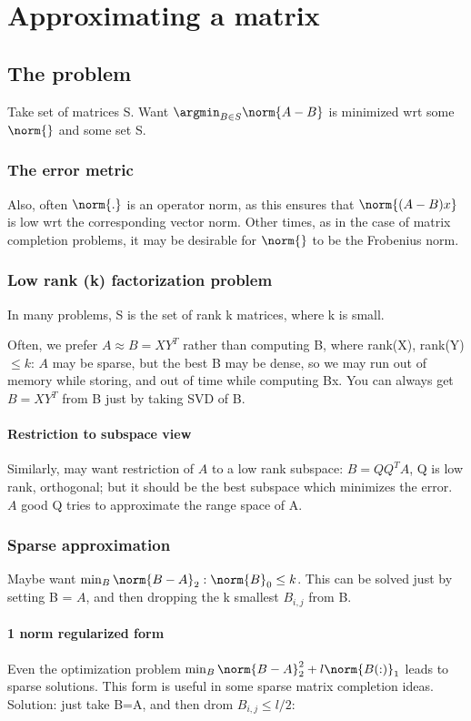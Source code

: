 \documentclass[oneside, article]{memoir}
\begin{document}
\section{Approximating a matrix}
\subsection{The problem}
Take set of matrices S. Want $\argmin_{B \in S} \norm{A - B}$ is minimized wrt some $\norm{}$ and some set S.

\subsubsection{The error metric}
Also, often $\norm{.}$ is an operator norm, as this ensures that $\norm{(A-B)x}$ is low wrt the corresponding vector norm. Other times, as in the case of matrix completion problems, it may be desirable for $\norm{}$ to be the Frobenius norm.

\subsubsection{Low rank (k) factorization problem}
In many problems, S is the set of rank k matrices, where k is small.

Often, we prefer $A \approx B = XY^{T}$ rather than computing B, where rank(X), rank(Y) $\leq k$: $A$ may be sparse, but the best B may be dense, so we may run out of memory while storing, and out of time while computing Bx. You can always get $B = XY^{T}$ from B just by taking SVD of B.

\paragraph*{Restriction to subspace view}
Similarly, may want restriction of $A$ to a low rank subspace: $B = QQ^{T}A$, Q is low rank, orthogonal; but it should be the best subspace which minimizes the error. $A$ good Q tries to approximate the range space of A.

\subsubsection{Sparse approximation}
Maybe want $\min_B \norm{B-A}_2: \norm{B}_0 \leq k$. This can be solved just by setting B = $A$, and then dropping the k smallest $B_{i, j}$ from B.

\paragraph*{1 norm regularized form}
Even the optimization problem $\min_B \norm{B-A}_2^{2} + l\norm{B(:)}_1 $ leads to sparse solutions.  This form is useful in some sparse matrix completion ideas. Solution: just take B=A, and then drom $B_{i,j} \leq l/2$: 
\end{document}
